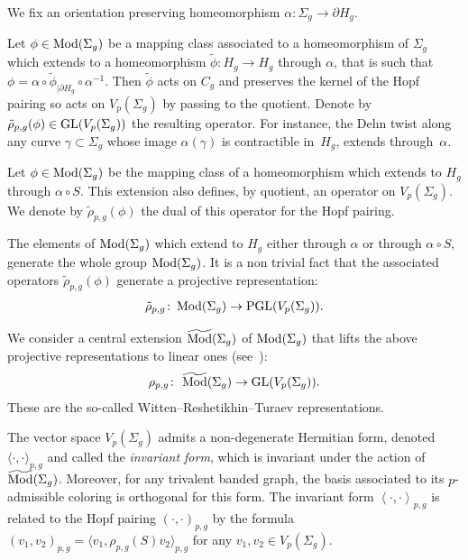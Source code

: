 \documentclass[pdftex]{sigma}
\numberwithin{equation}{section}
\begin{document}
We fix an orientation preserving homeomorphism $\alpha\colon \Sigma_g \rightarrow \partial H_g$.

Let $\phi \in \operatorname{Mod}(\Sigma_g)$ be a mapping class associated to a homeomorphism of $\Sigma_g$ which extends to a homeomorphism $\widetilde{\phi}\colon H_g\rightarrow H_g$ through $\alpha$, that is such that $\phi=\alpha\circ \widetilde{\phi}_{| \partial H_g}\circ \alpha^{-1}$. Then $\widetilde{\phi}$ acts on $C_g$ and preserves the kernel of the Hopf pairing so acts on $V_{p}(\Sigma_g)$ by passing to the quotient. Denote by $\tilde{\rho}_{p,g}(\phi) \in \operatorname{GL}(V_{p}(\Sigma_g))$ the resulting operator. For instance, the Dehn twist along any curve $\gamma\subset \Sigma_g$ whose image $\alpha(\gamma)$ is contractible in~$H_g$, extends through~$\alpha$.

Let $\phi\in \operatorname{Mod}(\Sigma_g)$ be the mapping class of a homeomorphism which extends to $H_g$ through $\alpha\circ S$. This extension also defines, by quotient, an operator on $V_{p}(\Sigma_g)$. We denote by $\tilde{\rho}_{p,g}(\phi)$ the dual of this operator for the Hopf pairing.

The elements of $\operatorname{Mod}(\Sigma_g)$ which extend to $H_g$ either through $\alpha$ or through $\alpha\circ S$, generate the whole group $\operatorname{Mod}(\Sigma_g)$. It is a non trivial fact that the associated operators $\tilde{\rho}_{p,g}(\phi)$ generate a projective representation:
\begin{gather*} \tilde{\rho}_{p,g} \colon \operatorname{Mod}(\Sigma_g) \rightarrow \operatorname{PGL}(V_{p}(\Sigma_g)).\end{gather*}

We consider a central extension $\widetilde{\operatorname{Mod}}(\Sigma_g)$ of $\operatorname{Mod}(\Sigma_g)$ that lifts the above projective representations to linear ones (see~\cite{GM13, MR}):
\begin{gather*} \rho_{p,g} \colon \ \widetilde{\operatorname{Mod}}(\Sigma_g) \rightarrow \operatorname{GL}(V_{p}(\Sigma_g)).\end{gather*}
These are the so-called Witten--Reshetikhin--Turaev representations.

The vector space $V_p(\Sigma_g)$ admits a non-degenerate Hermitian form, denoted $\langle \cdot, \cdot\rangle_{p,g}$ and called the \textit{invariant form}, which is invariant under the action of~$\widetilde{\operatorname{Mod}}(\Sigma_g)$. Moreover, for any trivalent banded graph, the basis associated to its $p$-admissible coloring is orthogonal for this form. The invariant form $\left<\cdot, \cdot\right>_{p,g}$ is related to the Hopf pairing $ (\cdot, \cdot )_{p,g}$ by the formula $ (v_1, v_2 )_{p,g}= \langle v_1, \rho_{p,g}(S)v_2\rangle _{p,g}$ for any $v_1,v_2\in V_p(\Sigma_g)$.
\end{document}
